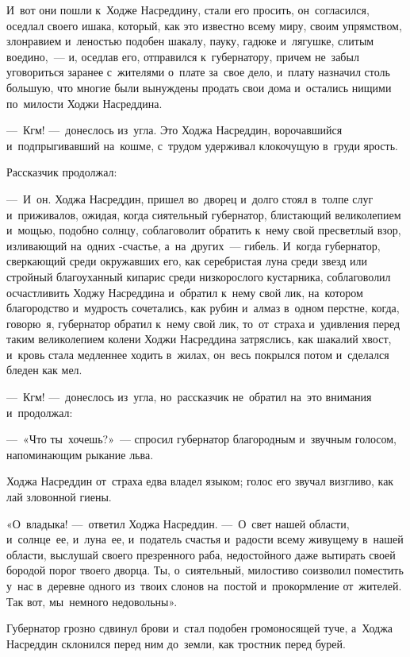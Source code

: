 \documentclass[12pt,a4paper]{book}
\begin{document}
И~вот они пошли к~Ходже Насреддину, стали его просить, он~согласился, оседлал своего ишака, который, как это известно всему миру, своим упрямством, злонравием и~леностью подобен шакалу, пауку, гадюке и~лягушке, слитым воедино,~— и, оседлав его, отправился к~губернатору, причем не~забыл уговориться заранее с~жителями о~плате за~свое дело, и~плату назначил столь большую, что многие были вынуждены продать свои дома и~остались нищими по~милости Ходжи Насреддина.

—~Кгм! —~донеслось из~угла. Это Ходжа Насреддин, ворочавшийся и~подпрыгивавший на~кошме, с~трудом удерживал клокочущую в~груди ярость.

Рассказчик продолжал:

—~И~он. Ходжа Насреддин, пришел во~дворец и~долго стоял в~толпе слуг и~приживалов, ожидая, когда сиятельный губернатор, блистающий великолепием и~мощью, подобно солнцу, соблаговолит обратить к~нему свой пресветлый взор, изливающий на~одних -счастье, а~на~других~— гибель. И~когда губернатор, сверкающий среди окружавших его, как серебристая луна среди звезд или стройный благоуханный кипарис среди низкорослого кустарника, соблаговолил осчастливить Ходжу Насреддина и~обратил к~нему свой лик, на~котором благородство и~мудрость сочетались, как рубин и~алмаз в~одном перстне, когда, говорю~я, губернатор обратил к~нему свой лик, то~от~страха и~удивления перед таким великолепием колени Ходжи Насреддина затряслись, как шакалий хвост, и~кровь стала медленнее ходить в~жилах, он~весь покрылся потом и~сделался бледен как мел.

—~Кгм! —~донеслось из~угла, но~рассказчик не~обратил на~это внимания и~продолжал:

—~«Что ты~хочешь?»~— спросил губернатор благородным и~звучным голосом, напоминающим рыкание льва.

Ходжа Насреддин от~страха едва владел языком; голос его звучал визгливо, как лай зловонной гиены.

«О~владыка! —~ответил Ходжа Насреддин. —~О~свет нашей области, и~солнце~ее, и~луна~ее, и~податель счастья и~радости всему живущему в~нашей области, выслушай своего презренного раба, недостойного даже вытирать своей бородой порог твоего дворца. Ты, о~сиятельный, милостиво соизволил поместить у~нас в~деревне одного из~твоих слонов на~постой и~прокормление от~жителей. Так вот, мы~немного недовольны».

Губернатор грозно сдвинул брови и~стал подобен громоносящей туче, а~Ходжа Насреддин склонился перед ним до~земли, как тростник перед бурей.
\end{document}
